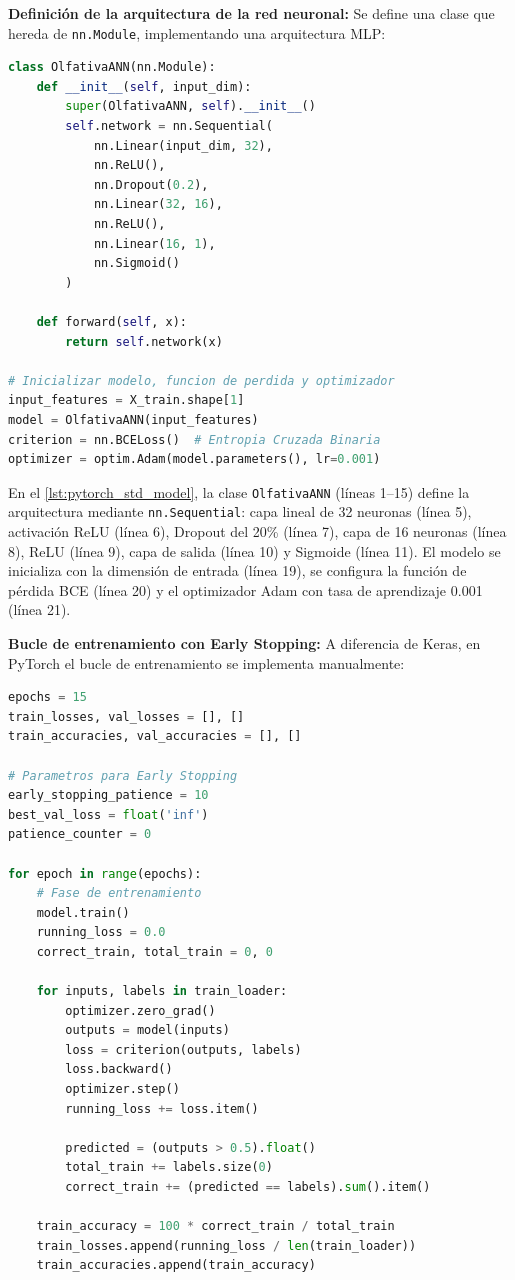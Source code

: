 \textbf{Definición de la arquitectura de la red neuronal:} Se define una clase que hereda de \texttt{nn.Module}, implementando una arquitectura MLP\@:

\begin{lstlisting}[language=Python, caption={Definición de la clase OlfativaANN en PyTorch.}, label={lst:pytorch_std_model}]
class OlfativaANN(nn.Module):
    def __init__(self, input_dim):
        super(OlfativaANN, self).__init__()
        self.network = nn.Sequential(
            nn.Linear(input_dim, 32),
            nn.ReLU(),
            nn.Dropout(0.2),
            nn.Linear(32, 16),
            nn.ReLU(),
            nn.Linear(16, 1),
            nn.Sigmoid()
        )

    def forward(self, x):
        return self.network(x)

# Inicializar modelo, funcion de perdida y optimizador
input_features = X_train.shape[1]
model = OlfativaANN(input_features)
criterion = nn.BCELoss()  # Entropia Cruzada Binaria
optimizer = optim.Adam(model.parameters(), lr=0.001)
\end{lstlisting}

En el \autoref{lst:pytorch_std_model}, la clase \texttt{OlfativaANN} (líneas 1--15) define la arquitectura mediante \texttt{nn.Sequential}: capa lineal de 32 neuronas (línea 5), activación ReLU (línea 6), Dropout del 20\% (línea 7), capa de 16 neuronas (línea 8), ReLU (línea 9), capa de salida (línea 10) y Sigmoide (línea 11). El modelo se inicializa con la dimensión de entrada (línea 19), se configura la función de pérdida BCE (línea 20) y el optimizador Adam con tasa de aprendizaje 0.001 (línea 21).

\textbf{Bucle de entrenamiento con Early Stopping:} A diferencia de Keras, en PyTorch el bucle de entrenamiento se implementa manualmente:

\begin{lstlisting}[language=Python, caption={Bucle de entrenamiento con Early Stopping en PyTorch.}, label={lst:pytorch_std_train}]
epochs = 15
train_losses, val_losses = [], []
train_accuracies, val_accuracies = [], []

# Parametros para Early Stopping
early_stopping_patience = 10
best_val_loss = float('inf')
patience_counter = 0

for epoch in range(epochs):
    # Fase de entrenamiento
    model.train()
    running_loss = 0.0
    correct_train, total_train = 0, 0
    
    for inputs, labels in train_loader:
        optimizer.zero_grad()
        outputs = model(inputs)
        loss = criterion(outputs, labels)
        loss.backward()
        optimizer.step()
        running_loss += loss.item()
        
        predicted = (outputs > 0.5).float()
        total_train += labels.size(0)
        correct_train += (predicted == labels).sum().item()

    train_accuracy = 100 * correct_train / total_train
    train_losses.append(running_loss / len(train_loader))
    train_accuracies.append(train_accuracy)
\end{lstlisting}

